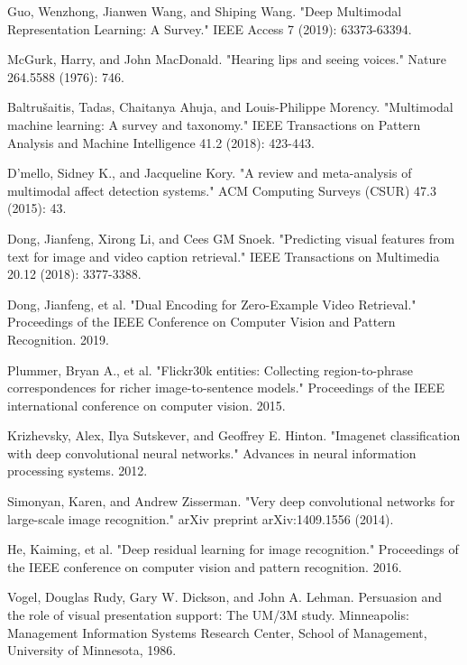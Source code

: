\documentclass[runningheads]{llncs}
\begin{document}
\begin{thebibliography}{8}
Guo, Wenzhong, Jianwen Wang, and Shiping Wang. "Deep Multimodal Representation Learning: A Survey." IEEE Access 7 (2019): 63373-63394.

McGurk, Harry, and John MacDonald. "Hearing lips and seeing voices." Nature 264.5588 (1976): 746.

Baltrušaitis, Tadas, Chaitanya Ahuja, and Louis-Philippe Morency. "Multimodal machine learning: A survey and taxonomy." IEEE Transactions on Pattern Analysis and Machine Intelligence 41.2 (2018): 423-443.

D'mello, Sidney K., and Jacqueline Kory. "A review and meta-analysis of multimodal affect detection systems." ACM Computing Surveys (CSUR) 47.3 (2015): 43.

Dong, Jianfeng, Xirong Li, and Cees GM Snoek. "Predicting visual features from text for image and video caption retrieval." IEEE Transactions on Multimedia 20.12 (2018): 3377-3388.

Dong, Jianfeng, et al. "Dual Encoding for Zero-Example Video Retrieval." Proceedings of the IEEE Conference on Computer Vision and Pattern Recognition. 2019.

Plummer, Bryan A., et al. "Flickr30k entities: Collecting region-to-phrase correspondences for richer image-to-sentence models." Proceedings of the IEEE international conference on computer vision. 2015.

Krizhevsky, Alex, Ilya Sutskever, and Geoffrey E. Hinton. "Imagenet classification with deep convolutional neural networks." Advances in neural information processing systems. 2012.

Simonyan, Karen, and Andrew Zisserman. "Very deep convolutional networks for large-scale image recognition." arXiv preprint arXiv:1409.1556 (2014).

He, Kaiming, et al. "Deep residual learning for image recognition." Proceedings of the IEEE conference on computer vision and pattern recognition. 2016.

Vogel, Douglas Rudy, Gary W. Dickson, and John A. Lehman. Persuasion and the role of visual presentation support: The UM/3M study. Minneapolis: Management Information Systems Research Center, School of Management, University of Minnesota, 1986.


\end{thebibliography}
\end{document}
